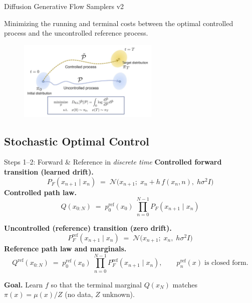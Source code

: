 \documentclass[aspectratio=169,xcolor=dvipsnames]{beamer}
\begin{document}
\begin{frame}[t]{Diffusion Generative Flow Samplers v2}

    Minimizing the running and terminal costs between the optimal controlled process and the uncontrolled reference process.

\begin{figure}
    \centering
    \includegraphics[width=0.6\textwidth]{figures/image.png}
\end{figure}

\end{frame}


\subsection{Stochastic Optimal Control}

\begin{frame}[t]{Steps 1--2: Forward \& Reference in \textit{discrete time}}
\footnotesize
\textbf{Controlled forward transition (learned drift).}
\[
P_F(x_{n+1}\mid x_n)\;=\;\mathcal N\!\big(x_{n+1};\;x_n + h\,f(x_n,n),\;h\sigma^2 I\big)
\]
\textbf{Controlled path law.}
\[
Q(x_{0:N})\;=\;p^{\text{ref}}_0(x_0)\;\prod_{n=0}^{N-1} P_F(x_{n+1}\mid x_n)
\]

\medskip
\textbf{Uncontrolled (reference) transition (zero drift).}
\[
P_F^{\text{ref}}(x_{n+1}\mid x_n)\;=\;\mathcal N\!\big(x_{n+1};\;x_n,\;h\sigma^2 I\big)
\]
\textbf{Reference path law and marginals.}
\[
Q^{\text{ref}}(x_{0:N})\;=\;p^{\text{ref}}_0(x_0)\;\prod_{n=0}^{N-1} P_F^{\text{ref}}(x_{n+1}\mid x_n),
\qquad p^{\text{ref}}_n(x)\;\text{is closed form.}
\]

\medskip
\textbf{Goal.} Learn $f$ so that the terminal marginal $Q(x_N)$ matches $\pi(x)=\mu(x)/Z$ (no data, $Z$ unknown).
\end{frame}


\end{document}
